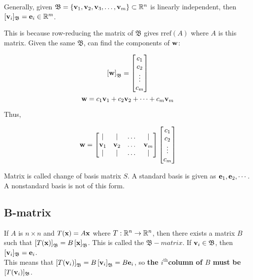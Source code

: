 \begin{framed}
\noindent
Generally, given $\mathfrak{B}=\left\{ \textbf v_1, \textbf v_2, \textbf v_3, \dots, \textbf v_m \right\}\subset \mathbb{R}^n$
is linearly independent, then $[\textbf{v}_i]_{\mathfrak{B}}=\textbf{e}_i\in\mathbb{R}^m$.
\end{framed}

This is because row-reducing the matrix of $\mathfrak{B}$ gives $\mathrm{rref}(A)$ where $A$ is this matrix. Given the same
$\mathfrak{B}$, can find the components of $\textbf{w}$:

\[\left[\textbf w \right]_\mathfrak{B}=\begin{bmatrix}c_1\\c_2\\ \vdots\\ c_m\end{bmatrix}\]
\[\textbf{w}=c_{1} \textbf{v}_{1}+c_{2} \textbf{v}_{2}+\cdots+c_{m} \textbf{v}_{m}\]

Thus,

\[\textbf w = \begin{bmatrix}|&|&\dots&|\\ \textbf v_1 &\textbf v_2 & \dots &\textbf v_m\\  |&|&\dots&| \end{bmatrix}\begin{bmatrix}c_1\\c_2\\\vdots\\c_m\end{bmatrix}\]

Matrix is called change of basis matrix $S$. A standard basis is given as $\textbf{e}_1,\textbf{e}_2,\cdots$. A nonstandard basis is not of this form.

\subsection{B-matrix}

If $A$ is $n\times n$ and $T(\textbf{x})=A\textbf{x}$ where $T:\mathbb{R}^n\rightarrow \mathbb{R}^n$, then there exists a matrix $B$ such that
$\left[T(\textbf x)\right]_\mathfrak{B}=B\left[\textbf x\right]_\mathfrak{B}$. This is called the $\mathfrak{B}-matrix$.
If $\textbf{v}_i\in \mathfrak{B}$, then $[\textbf{v}_i]_\mathfrak{B}=\textbf{e}_i$.\\

\noindent
This means that 
$\left[T(\textbf v_i)\right]_\mathfrak{B}=B\left[\textbf v_i \right]_\mathfrak{B}=B\textbf e_i$, so 
\textbf{the $i^{\mathrm{th}}$column of $B$ must be $[T(\textbf{v}_i)]_\mathfrak{B}$}.\\

